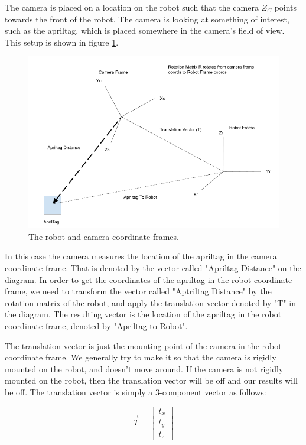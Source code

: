 \documentclass[11pt]{article}
\begin{document}
The camera is placed on a location on the robot such that the camera $Z_C$ points towards
the front of the robot.  The camera is looking at something of interest, such as the apriltag,
which is placed somewhere in the camera's field of view.  This setup is shown in figure \ref{fig:robot}.

\begin{figure}[h!]
    \centering
    \includegraphics[scale=0.5]{figures/robot.png}
    \caption{The robot and camera coordinate frames.}
    \label{fig:robot}
\end{figure}


In this case the camera measures the location of the apriltag in the camera coordinate frame.
That is denoted by the vector called "Apriltag Distance" on the diagram.  In order to get the
coordinates of the apriltag in the robot coordinate frame, we need to transform the vector
called "Aptriltag Distance" by the rotation matrix of the robot, and apply the translation
vector denoted by "T" in the diagram.  The resulting vector is the location of the apriltag
in the robot coordinate frame, denoted by "Apriltag to Robot".

The translation vector is just the mounting point of the camera in the robot coordinate frame.
We generally try to make it so that the camera is rigidly mounted on the robot, and
doesn't move around.  If the camera is not rigidly mounted on the robot, then the translation vector
will be off and our results will be off.  The translation vector is simply a 3-component vector
as follows:

\begin{equation}
    \vec{T} = \begin{bmatrix}
        t_x \\
        t_y \\
        t_z
    \end{bmatrix}
\end{equation}
\end{document}
